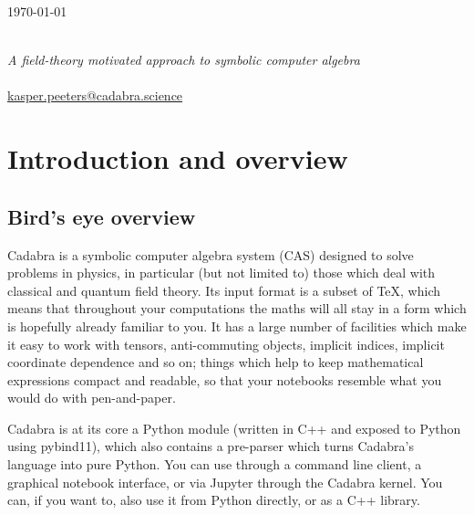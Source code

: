 \documentclass[11pt]{book}
\begin{document}
\pagestyle{empty}
\begin{flushright}
\today
\end{flushright}
\vspace{6ex}
{\bf {}}~\\[.8ex] 
{\it\large A field-theory motivated approach to symbolic computer algebra}\\[6ex]
{\bf {}}
\newpage
\pagestyle{empty}
\hbox{~}
\vfill
{}\\[3ex]
\href{mailto:kasper.peeters@cadabra.science}{kasper.peeters@cadabra.science}

\tableofcontents

\pagestyle{fancy} 

\chapter{Introduction and overview}
\section{Bird's eye overview}

Cadabra is a symbolic computer algebra system (CAS) designed to solve
problems in physics, in particular (but not limited to) those which
deal with classical and quantum field theory. Its input format is a
subset of TeX, which means that throughout your computations the maths
will all stay in a form which is hopefully already familiar to you.
It has a large number of facilities which make it easy to work with
tensors, anti-commuting objects, implicit indices, implicit coordinate
dependence and so on; things which help to keep mathematical
expressions compact and readable, so that your notebooks resemble what
you would do with pen-and-paper.


Cadabra is at its core a Python module (written in C++ and exposed to
Python using pybind11), which also contains a pre-parser which turns
Cadabra's language into pure Python. You can use through a command
line client, a graphical notebook interface, or via Jupyter through
the Cadabra kernel. You can, if you want to, also use it from Python
directly, or as a C++ library.
\end{document}
